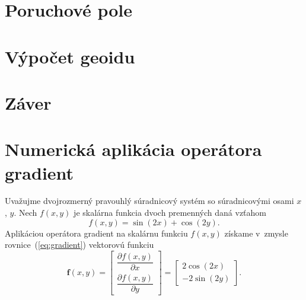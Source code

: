 \documentclass[a4paper, 12pt]{book}
\let\vec\mathbf
\begin{document}
\chapter{Poruchové pole}
\label{sec:disturbing_field}








\chapter{Výpočet geoidu}
\label{sec:geoid_determination}







\chapter*{Záver}







\appendix
\chapter{Numerická aplikácia operátora gradient}
\label{app:numerical_application_of_gradient}

Uvažujme dvojrozmerný pravouhlý súradnicový systém so súradnicovými osami $x$, 
$y$.  Nech $f(x, y)$ je skalárna funkcia dvoch premenných daná vzťahom
%
\begin{equation}
\label{eq:f}
f(x, y) = \sin(2x) + \cos(2y){.}
\end{equation}
%
Aplikáciou operátora gradient na skalárnu funkciu $f(x, y)$ získame v~zmysle 
rovnice~(\ref{eq:gradient}) vektorovú funkciu
%
\begin{equation}
\label{eq:gradf}
\vec f(x, y) =
\begin{bmatrix}
\dfrac{\partial f(x, y)}{\partial x} \\[2ex]
\dfrac{\partial f(x, y)}{\partial y}
\end{bmatrix}
=
\begin{bmatrix}
2 \cos(2x) \\[2ex]
-2 \sin(2y)
\end{bmatrix}
{.}
\end{equation}
\end{document}
